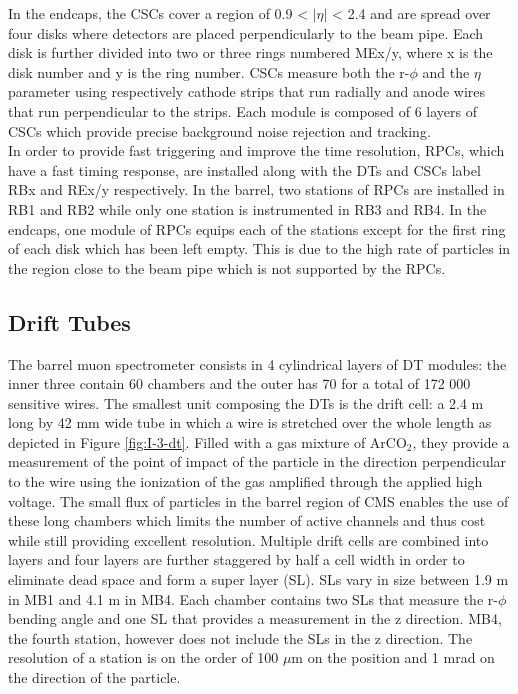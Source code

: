     In the endcaps, the CSCs cover a region of 0.9 < $ | \eta | $ < 2.4 and are spread over four disks where detectors are placed perpendicularly to the beam pipe. Each disk is further divided into two or three rings numbered MEx/y, where x is the disk number and y is the ring number. CSCs measure both the r-$\phi$ and the $ \eta $ parameter using respectively cathode strips that run radially and anode wires that run perpendicular to the strips. Each module is composed of 6 layers of CSCs which provide precise background noise rejection and tracking. \\

    In order to provide fast triggering and improve the time resolution, RPCs, which have a fast timing response, are installed along with the DTs and CSCs label RBx and REx/y respectively. In the barrel, two stations of RPCs are installed in RB1 and RB2 while only one station is instrumented in RB3 and RB4. In the endcaps, one module of RPCs equips each of the stations except for the first ring of each disk which has been left empty. This is due to the high rate of particles in the region close to the beam pipe which is not supported by the RPCs.

    \subsection{Drift Tubes}

      The barrel muon spectrometer consists in 4 cylindrical layers of DT modules: the inner three contain 60 chambers and the outer has 70 for a total of 172 000 sensitive wires. The smallest unit composing the DTs is the drift cell: a 2.4 m long by 42 mm wide tube in which a wire is stretched over the whole length as depicted in Figure \ref{fig:I-3-dt}. Filled with a gas mixture of ArCO$_2$, they provide a measurement of the point of impact of the particle in the direction perpendicular to the wire using the ionization of the gas amplified through the applied high voltage. The small flux of particles in the barrel region of CMS enables the use of these long chambers which limits the number of active channels and thus cost while still providing excellent resolution. Multiple drift cells are combined into layers and four layers are further staggered by half a cell width in order to eliminate dead space and form a super layer (SL). SLs vary in size between 1.9 m in MB1 and 4.1 m in MB4. Each chamber contains two SLs that measure the r-$\phi$ bending angle and one SL that provides a measurement in the z direction. MB4, the fourth station, however does not include the SLs in the z direction. The resolution of a station is on the order of 100 $\mu$m on the position and 1 mrad on the direction of the particle. \\

